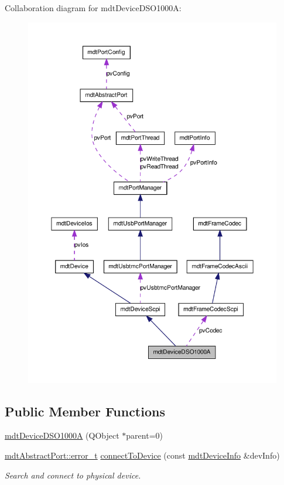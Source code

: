 Collaboration diagram for mdtDeviceDSO1000A:
\nopagebreak
\begin{figure}[H]
\begin{center}
\leavevmode
\includegraphics[width=400pt]{classmdt_device_d_s_o1000_a__coll__graph}
\end{center}
\end{figure}
\subsection*{Public Member Functions}
\begin{DoxyCompactItemize}
\item 
\hyperlink{classmdt_device_d_s_o1000_a_a3c4cd1418250864589284a3540353fdb}{mdtDeviceDSO1000A} (QObject $\ast$parent=0)
\item 
\hyperlink{classmdt_abstract_port_ad4121bb930c95887e77f8bafa065a85e}{mdtAbstractPort::error\_\-t} \hyperlink{classmdt_device_d_s_o1000_a_a84431cf929750a8a25d5218893736c72}{connectToDevice} (const \hyperlink{classmdt_device_info}{mdtDeviceInfo} \&devInfo)
\begin{DoxyCompactList}\small\item\em Search and connect to physical device. \end{DoxyCompactList}\end{DoxyCompactItemize}


